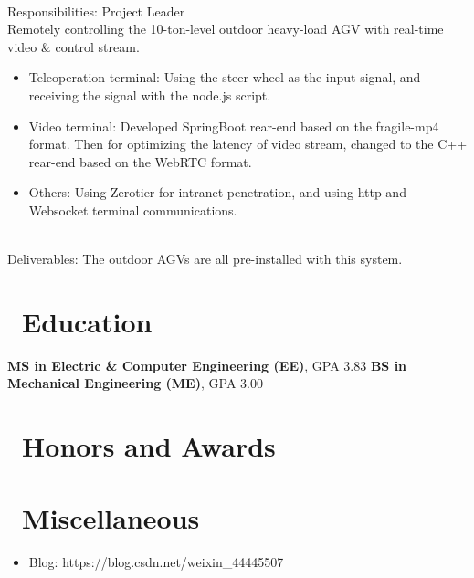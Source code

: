 \documentclass[a4paper,10pt]{resume}
\begin{document}
\\Responsibilities: Project Leader
\\Remotely controlling the 10-ton-level outdoor heavy-load AGV with real-time video \& control stream.
\begin{itemize}[parsep=0.5ex]
  \item Teleoperation terminal: Using the steer wheel as the input signal, and receiving the signal with the node.js script.
  \item Video terminal: Developed SpringBoot rear-end based on the fragile-mp4 format. Then for optimizing the latency of video stream, changed to the C++ rear-end based on the WebRTC format.
  \item Others: Using Zerotier for intranet penetration, and using http and Websocket terminal communications.
\end{itemize}
\\Deliverables: The outdoor AGVs are all pre-installed with this system.

\section{\faGraduationCap\ Education}
\textbf{MS in Electric \& Computer Engineering (EE)}, GPA 3.83
\textbf{BS in Mechanical Engineering (ME)}, GPA 3.00

\section{\faHeartO\ Honors and Awards}

\section{\faInfo\ Miscellaneous}
\begin{itemize}[parsep=0.5ex]
  \item Blog: https://blog.csdn.net/weixin\_44445507
\end{itemize}

%
%
\end{document}
